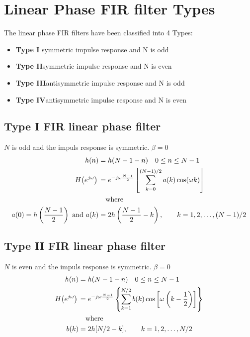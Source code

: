 \documentclass[accentcolor=tud4c,9.5pt,nochapname,bigchapter,paper=a5report]{tudreport}
\begin{document}
\section {Linear Phase FIR filter Types}
The linear phase FIR filters have been classified into 4 Types:

\begin{itemize}
  \item {\bf Type I} \quad symmetric impulse response and N is odd
  \item {\bf Type II}\quad symmetric impulse response and N is even
  \item {\bf Type III}\quad antisymmetric impulse response and N is odd
  \item {\bf Type IV}\quad antisymmetric impulse response and N is even
\end{itemize}

\subsection {Type I FIR linear phase filter}
$N$ is odd and the impuls response is symmetric. $\beta=0$ 
\begin{subequations}
\begin{align}
	h(n)&=h(N-1-n) \quad 0\leq n \leq N-1 \\
	H{\left(e^{j\omega}\right)}\, &= e^{-j\omega \frac{N-1}{2}}\left[{\sum\limits_{k=0}^{(N-1)/2} a(k)\cos(\omega k)}\right]\\
	&\quad\text{where}\notag\\
	a(0)=h\left(\frac{N-1}{2}\right) \text{ and } a(k)&=2h\left(\frac{N-1}{2}-k\right), \quad\quad k=1,2,\ldots,(N-1)/2 \notag
\end{align}
\end{subequations}

\subsection {Type II FIR linear phase filter}
$N$ is even and the impuls response is symmetric. $\beta=0$ 
\begin{subequations}
\begin{align}
	h(n)&=h(N-1-n) \quad 0\leq n \leq N-1 \\
	H{\left(e^{j\omega}\right)}\, &= e^{-j\omega \frac{N-1}{2}}\left\{{\sum\limits_{k=1}^{N/2} b(k)\cos\left[\omega \left(k-\frac{1}{2}\right)\right]}\right\}\\
	&\quad\text{where}\notag\\
	b(k)&=2h[N/2-k], \quad\quad k=1,2,\ldots,N/2 \notag
\end{align}
\end{subequations}
\end{document}
